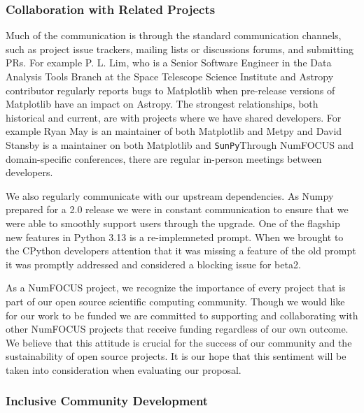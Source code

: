 \documentclass[12pt]{article}
\numberwithin{page}{section}
\begin{document}
\subsubsection{Collaboration with Related Projects}


Much of the communication is through the standard communication channels, such
as project issue trackers, mailing lists or discussions forums, and submitting
PRs.  For example P. L. Lim, who is a Senior Software Engineer in the Data
Analysis Tools Branch at the Space Telescope Science Institute and Astropy
contributor regularly reports bugs to Matplotlib when pre-release versions of
Matplotlib have an impact on Astropy.  The strongest relationships, both
historical and current, are with projects where we have shared developers.
For example Ryan May is an maintainer of both Matplotlib and Metpy and David
Stansby is a maintainer on both Matplotlib and \texttt{SunPy}Through NumFOCUS
and domain-specific conferences, there are regular in-person meetings between
developers.

We also regularly communicate with our upstream dependencies.  As Numpy
prepared for a 2.0 release we were in constant communication to ensure that we
were able to smoothly support users through the upgrade.  One of the flagship
new features in Python 3.13 is a re-implemneted prompt.  When we brought to the
CPython developers attention that it was missing a feature of the old prompt it
was promptly addressed and considered a blocking issue for beta2.

As a NumFOCUS project, we recognize the importance of every project
that is part of our open source scientific computing community. Though
we would like for our work to be funded we are committed to supporting
and collaborating with other NumFOCUS projects that receive funding
regardless of our own outcome. We believe that this attitude is
crucial for the success of our community and the sustainability of
open source projects. It is our hope that this sentiment will be taken
into consideration when evaluating our proposal.


\subsubsection{Inclusive Community Development}
\end{document}

